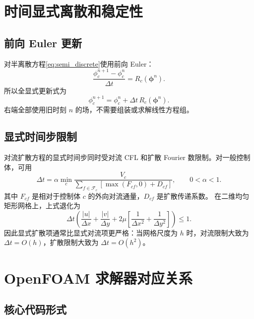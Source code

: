 \documentclass[UTF8,12pt,a4paper]{ctexart}
\numberwithin{equation}{section}
\begin{document}
\section{时间显式离散和稳定性}

\subsection{前向 Euler 更新}

对半离散方程\eqref{eq:semi_discrete}使用前向 Euler：
\begin{equation}
  \frac{\phi_c^{n+1}-\phi_c^n}{\Delta t}
  =
  R_c(\bm\phi^n).
  \label{eq:forward_euler}
\end{equation}
所以全显式更新式为
\begin{equation}
  \boxed{
  \phi_c^{n+1}
  =
  \phi_c^n+\Delta t\,R_c(\bm\phi^n).}
  \label{eq:explicit_update}
\end{equation}
右端全部使用旧时刻 $n$ 的场，不需要组装或求解线性方程组。

\subsection{显式时间步限制}

对流扩散方程的显式时间步同时受对流 CFL 和扩散 Fourier 数限制。对一般控制体，可用
\begin{equation}
  \Delta t
  =
  \alpha
  \min_c
  \frac{V_c}{
  \displaystyle
  \sum_{f\in\mathcal F_c}
  \left[
  \max(F_{cf},0)+D_{cf}
  \right]},
  \qquad
  0<\alpha<1.
  \label{eq:stable_dt_general}
\end{equation}
其中 $F_{cf}$ 是相对于控制体 $c$ 的外向对流通量，$D_{cf}$ 是扩散传递系数。
在二维均匀矩形网格上，上式退化为
\begin{equation}
  \Delta t
  \left(
  \frac{|u|}{\Delta x}
  +
  \frac{|v|}{\Delta y}
  +
  2\mu
  \left[
  \frac{1}{\Delta x^2}
  +
  \frac{1}{\Delta y^2}
  \right]
  \right)
  \le 1.
  \label{eq:stable_dt_cartesian}
\end{equation}
因此显式扩散项通常比显式对流项更严格：当网格尺度为 $h$ 时，对流限制大致为
$\Delta t=O(h)$，扩散限制大致为 $\Delta t=O(h^2)$。

\section{OpenFOAM 求解器对应关系}

\subsection{核心代码形式}
\end{document}
